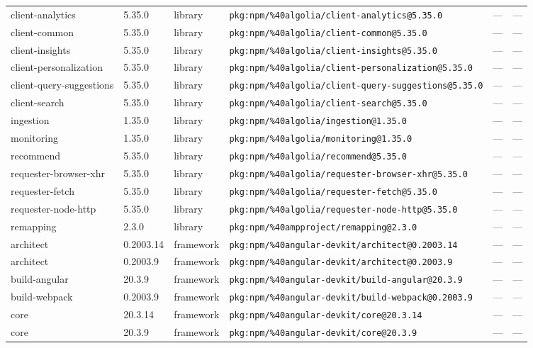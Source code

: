 \documentclass[11pt]{article}
\begin{document}
\begin{longtable}{|l|l|l|p{2.2cm}|l|p{4cm}|}
client-analytics & 5.35.0 & library & \texttt{pkg:npm/\%40algolia/client-analytics@5.35.0} & — & — \\
client-common & 5.35.0 & library & \texttt{pkg:npm/\%40algolia/client-common@5.35.0} & — & — \\
client-insights & 5.35.0 & library & \texttt{pkg:npm/\%40algolia/client-insights@5.35.0} & — & — \\
client-personalization & 5.35.0 & library & \texttt{pkg:npm/\%40algolia/client-personalization@5.35.0} & — & — \\
client-query-suggestions & 5.35.0 & library & \texttt{pkg:npm/\%40algolia/client-query-suggestions@5.35.0} & — & — \\
client-search & 5.35.0 & library & \texttt{pkg:npm/\%40algolia/client-search@5.35.0} & — & — \\
ingestion & 1.35.0 & library & \texttt{pkg:npm/\%40algolia/ingestion@1.35.0} & — & — \\
monitoring & 1.35.0 & library & \texttt{pkg:npm/\%40algolia/monitoring@1.35.0} & — & — \\
recommend & 5.35.0 & library & \texttt{pkg:npm/\%40algolia/recommend@5.35.0} & — & — \\
requester-browser-xhr & 5.35.0 & library & \texttt{pkg:npm/\%40algolia/requester-browser-xhr@5.35.0} & — & — \\
requester-fetch & 5.35.0 & library & \texttt{pkg:npm/\%40algolia/requester-fetch@5.35.0} & — & — \\
requester-node-http & 5.35.0 & library & \texttt{pkg:npm/\%40algolia/requester-node-http@5.35.0} & — & — \\
remapping & 2.3.0 & library & \texttt{pkg:npm/\%40ampproject/remapping@2.3.0} & — & — \\
architect & 0.2003.14 & framework & \texttt{pkg:npm/\%40angular-devkit/architect@0.2003.14} & — & — \\
architect & 0.2003.9 & framework & \texttt{pkg:npm/\%40angular-devkit/architect@0.2003.9} & — & — \\
build-angular & 20.3.9 & framework & \texttt{pkg:npm/\%40angular-devkit/build-angular@20.3.9} & — & — \\
build-webpack & 0.2003.9 & framework & \texttt{pkg:npm/\%40angular-devkit/build-webpack@0.2003.9} & — & — \\
core & 20.3.14 & framework & \texttt{pkg:npm/\%40angular-devkit/core@20.3.14} & — & — \\
core & 20.3.9 & framework & \texttt{pkg:npm/\%40angular-devkit/core@20.3.9} & — & — \\

\end{longtable}
\end{document}
